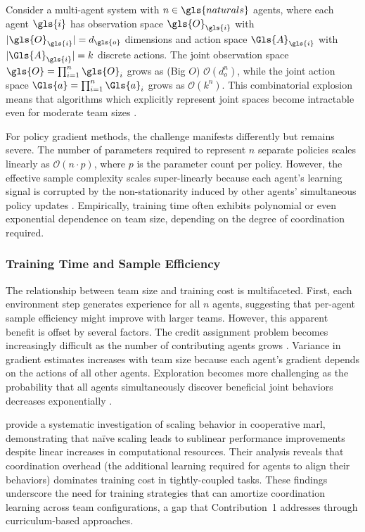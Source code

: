 Consider a multi-agent system with \(n\in\gls{naturals}\) agents, 
where each agent \(\gls{i}\) has observation space \(\gls{O}_{\gls{i}}\)
with \(|\gls{O}_{\gls{i}}| = d_{\gls{o}}\) dimensions and action space 
\(\Gls{A}_{\gls{i}}\) with \(|\Gls{A}_{\gls{i}}| = k\) discrete actions. 
The joint observation space \(\gls{O} = \prod_{i=1}^{n} \gls{O}_i\)
grows as (Big \(O\)) \(\mathcal{O}(d_o^n)\), while the joint action space 
\(\Gls{a} = \prod_{i=1}^{n} \Gls{a}_{i}\) grows as \(\mathcal{O}(k^n)\). 
This combinatorial explosion means that algorithms which explicitly 
represent joint spaces become intractable even for moderate team sizes 
\cite{hernandez-leal2019}.

For policy gradient methods, the challenge manifests differently but remains severe. 
The number of parameters required to represent \(n\) separate policies scales linearly 
as \(\mathcal{O}(n \cdot p)\), where \(p\) is the parameter count per policy. 
However, the effective sample complexity scales super-linearly because each 
agent's learning signal is corrupted by the non-stationarity induced by 
other agents' simultaneous policy updates \cite{zhang2021}. 
Empirically, training time often exhibits polynomial or even exponential 
dependence on team size, depending on the degree of coordination required.

\subsubsection{Training Time and Sample Efficiency}

The relationship between team size and training cost is multifaceted. 
First, each environment step generates experience for all \(n\) agents, 
suggesting that per-agent sample efficiency might improve with larger teams. 
However, this apparent benefit is offset by several factors. 
The credit assignment problem becomes increasingly difficult as the 
number of contributing agents grows \cite{foerster2018}. 
Variance in gradient estimates increases with team size because 
each agent's gradient depends on the actions of all other agents. 
Exploration becomes more challenging as the probability that all 
agents simultaneously discover beneficial joint behaviors decreases 
exponentially \cite{hernandez-leal2019}.

\cite{liu2024a} provide a systematic investigation of scaling behavior 
in cooperative \gls{marl}, demonstrating that na\"ive scaling leads 
to sublinear performance improvements despite linear increases in 
computational resources. Their analysis reveals that coordination overhead
(the additional learning required for agents to align their behaviors)
dominates training cost in tightly-coupled tasks. 
These findings underscore the need for training strategies that can 
amortize coordination learning across team configurations, 
a gap that Contribution~1 addresses through curriculum-based approaches.

